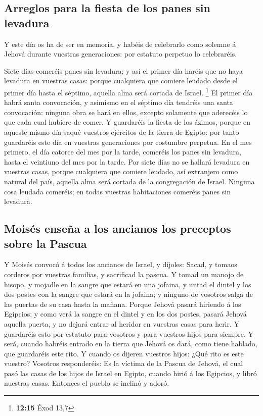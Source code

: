 \hypertarget{arreglos-para-la-fiesta-de-los-panes-sin-levadura}{%
\subsection{Arreglos para la fiesta de los panes sin
levadura}\label{arreglos-para-la-fiesta-de-los-panes-sin-levadura}}

 Y este día os ha de ser en memoria, y habéis de
celebrarlo como solemne á Jehová durante vuestras generaciones: por
estatuto perpetuo lo celebraréis.

 Siete días comeréis panes sin levadura; y así el primer
día haréis que no haya levadura en vuestras casas: porque cualquiera que
comiere leudado desde el primer día hasta el séptimo, aquella alma será
cortada de Israel. \footnote{\textbf{12:15} Éxod 13,7} 
El primer día habrá santa convocación, y asimismo en el séptimo día
tendréis una santa convocación: ninguna obra se hará en ellos, excepto
solamente que aderecéis lo que cada cual hubiere de comer.
 Y guardaréis la fiesta de los ázimos, porque en aqueste
mismo día saqué vuestros ejércitos de la tierra de Egipto: por tanto
guardaréis este día en vuestras generaciones por costumbre perpetua.
 En el mes primero, el día catorce del mes por la tarde,
comeréis los panes sin levadura, hasta el veintiuno del mes por la
tarde.  Por siete días no se hallará levadura en vuestras
casas, porque cualquiera que comiere leudado, así extranjero como
natural del país, aquella alma será cortada de la congregación de
Israel.  Ninguna cosa leudada comeréis; en todas vuestras
habitaciones comeréis panes sin levadura.

\hypertarget{moisuxe9s-enseuxf1a-a-los-ancianos-los-preceptos-sobre-la-pascua}{%
\subsection{Moisés enseña a los ancianos los preceptos sobre la
Pascua}\label{moisuxe9s-enseuxf1a-a-los-ancianos-los-preceptos-sobre-la-pascua}}

 Y Moisés convocó á todos los ancianos de Israel, y
díjoles: Sacad, y tomaos corderos por vuestras familias, y sacrificad la
pascua.  Y tomad un manojo de hisopo, y mojadle en la
sangre que estará en una jofaina, y untad el dintel y los dos postes con
la sangre que estará en la jofaina; y ninguno de vosotros salga de las
puertas de su casa hasta la mañana.  Porque Jehová pasará
hiriendo á los Egipcios; y como verá la sangre en el dintel y en los dos
postes, pasará Jehová aquella puerta, y no dejará entrar al heridor en
vuestras casas para herir.  Y guardaréis esto por
estatuto para vosotros y para vuestros hijos para siempre.
 Y será, cuando habréis entrado en la tierra que Jehová
os dará, como tiene hablado, que guardaréis este rito.  Y
cuando os dijeren vuestros hijos: ¿Qué rito es este vuestro?
 Vosotros responderéis: Es la víctima de la Pascua de
Jehová, el cual pasó las casas de los hijos de Israel en Egipto, cuando
hirió á los Egipcios, y libró nuestras casas. Entonces el pueblo se
inclinó y adoró.

